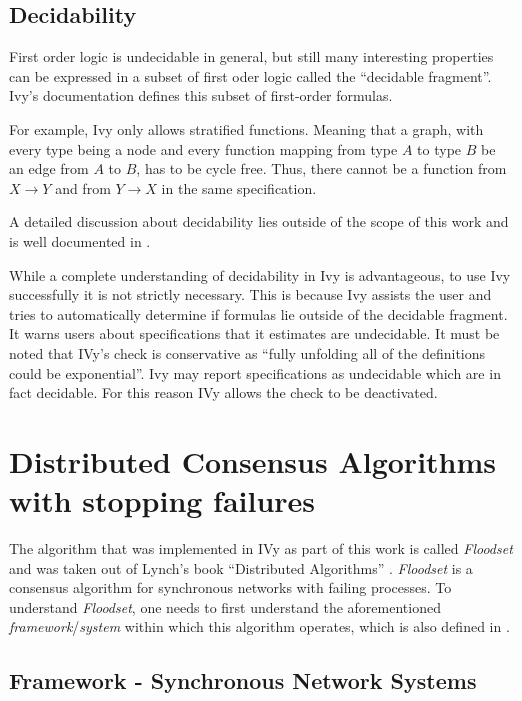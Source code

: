 \documentclass[fleqn]{article}
\begin{document}
\subsection{Decidability}
First order logic is undecidable in general, but still many interesting properties can be expressed in a subset of first oder logic called the ``decidable fragment''. Ivy's documentation defines this subset of first-order formulas. \cite{decid}

For example, Ivy only allows stratified functions. Meaning that a graph, with every type being a node and every function mapping from type $A$ to type $B$ be an edge from $A$ to $B$, has to be cycle free. Thus, there cannot be a function from $X \rightarrow Y$ and from $Y \rightarrow X$ in the same specification.

A detailed discussion about decidability lies outside of the scope of this work and is well documented in \cite{decide}.

While a complete understanding of decidability in Ivy is advantageous, to use Ivy successfully it is not strictly necessary. This is because Ivy assists the user and tries to automatically determine if formulas lie outside of the decidable fragment. It warns users about specifications that it estimates are undecidable.  It must be noted that IVy's check is conservative as ``fully unfolding all of the definitions could be exponential''. Ivy may report specifications as undecidable which are in fact decidable. For this reason IVy allows the check to be deactivated. \cite{decid}


\section{Distributed Consensus Algorithms with stopping failures}

The algorithm that was implemented in IVy as part of this work is called \textit{Floodset} and was taken out of Lynch's book ``Distributed Algorithms'' \cite{refNancy}.
\textit{Floodset} is a consensus algorithm for synchronous networks with failing processes.
To understand \textit{Floodset}, one needs to first understand the aforementioned \textit{framework}/\textit{system} within which this algorithm operates, which is also defined in \cite{refNancy}.

\subsection{Framework - Synchronous Network Systems}
\end{document}
